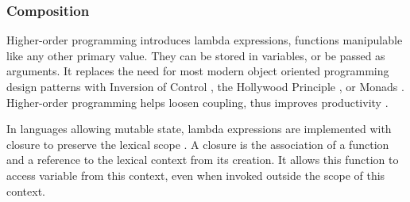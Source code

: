 \subsubsection{Composition} \label{chapter3:definitions:productivity:composition}

Higher-order programming introduces lambda expressions, functions manipulable like any other primary value.
They can be stored in variables, or be passed as arguments.
It replaces the need for most modern object oriented programming design patterns  with Inversion of Control \cite{Johnson}, the Hollywood Principle \cite{Sweet1985}, or Monads \cite{Wadler1992}.
Higher-order programming helps loosen coupling, thus improves productivity \cite{Haynes1984}.

In languages allowing mutable state, lambda expressions are implemented with closure to preserve the lexical scope \cite{Sussman1998}.
A closure is the association of a function and a reference to the lexical context from its creation.
It allows this function to access variable from this context, even when invoked outside the scope of this context.


